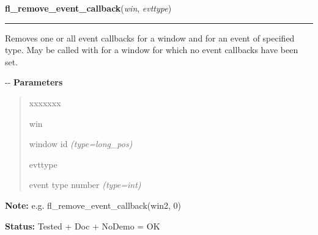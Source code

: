 \hspace{.8\funcindent}\begin{boxedminipage}{\funcwidth}

    \raggedright \textbf{fl\_remove\_event\_callback}(\textit{win}, \textit{evttype})

    \vspace{-1.5ex}

    \rule{\textwidth}{0.5\fboxrule}
\setlength{\parskip}{2ex}

Removes one or all event callbacks for a window and for an event of
specified type. May be called with for a window for which no event
callbacks have been set.

-{}-
\setlength{\parskip}{1ex}
      \textbf{Parameters}
      \vspace{-1ex}

      \begin{quote}
        \begin{Ventry}{xxxxxxx}

          \item[win]


window id
            {\it (type=long\_pos)}

          \item[evttype]


event type number
            {\it (type=int)}

        \end{Ventry}

      \end{quote}

\textbf{Note:} 
e.g. fl\_remove\_event\_callback(win2, 0)


\textbf{Status:} 
Tested + Doc + NoDemo = OK


    \end{boxedminipage}

    \label{xformslib:flxbasic:fl_activate_event_callbacks}

    \vspace{0.5ex}

